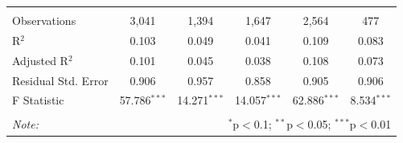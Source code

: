 \documentclass[12pt,a4paper]{article}
\numberwithin{equation}{section}
\begin{document}
{\begin{table}[!htbp]
\begin{tabular}{@{\extracolsep{5pt}}lccccc}
  & & & & & \\ 
\hline \\[-1.8ex] 
Observations & 3,041 & 1,394 & 1,647 & 2,564 & 477 \\ 
R$^{2}$ & 0.103 & 0.049 & 0.041 & 0.109 & 0.083 \\ 
Adjusted R$^{2}$ & 0.101 & 0.045 & 0.038 & 0.108 & 0.073 \\ 
Residual Std. Error & 0.906 & 0.957 & 0.858 & 0.905 & 0.906 \\ 
F Statistic & 57.786$^{***}$ & 14.271$^{***}$ & 14.057$^{***}$ & 62.886$^{***}$ & 8.534$^{***}$ \\ 
\hline 
\hline \\[-1.8ex] 
\textit{Note:}  & \multicolumn{5}{r}{$^{*}$p$<$0.1; $^{**}$p$<$0.05; $^{***}$p$<$0.01} \\ 
\end{tabular} 
\end{table} 

\newpage

}
\end{document}
